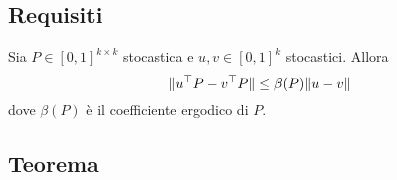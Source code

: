 %
%
%
%


\subsection{Requisiti}
\begin{lemma}[di contrazione]\label{lemma:contra}
	Sia $P\in[0,1]^{k\times k}$ stocastica e $u,v\in[0,1]^k$ stocastici. Allora
	\begin{equation*}
		\|u^\top P-v^\top P\| \le \beta(P)\|u-v\|
	\end{equation*}
	dove $\beta(P)$ è il coefficiente ergodico di $P$.
\end{lemma}


\subsection{Teorema}
